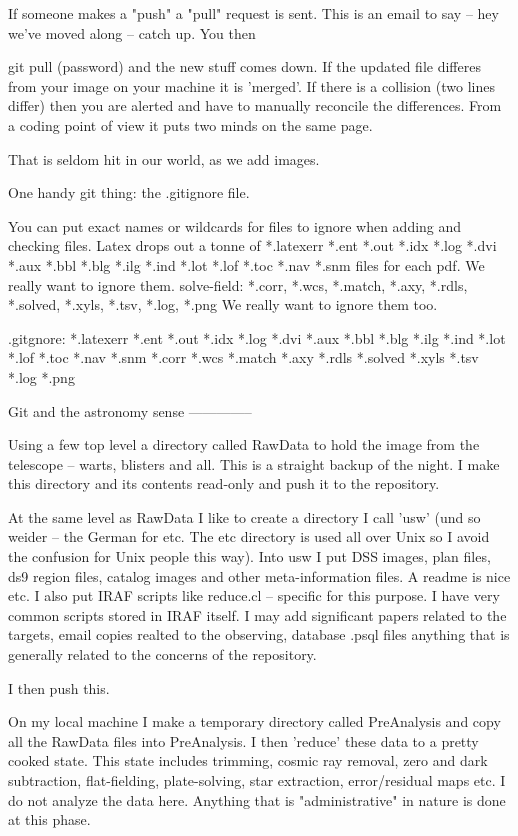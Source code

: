 If someone makes a "push" a "pull" request is sent. This is an email
to say -- hey we've moved along -- catch up. You then

git pull
(password)
and the new stuff comes down.
If the updated file differes from your image on your machine it is
'merged'. If there is a collision (two lines differ) then you are
alerted and have to manually reconcile the differences. From a coding
point of view it puts two minds on the same page.

That is seldom hit in our world, as we add images.

One handy git thing: the .gitignore file.

You can put exact names or wildcards for files to ignore when adding
and checking files. Latex drops out a tonne of *.latexerr *.ent *.out
*.idx *.log *.dvi *.aux *.bbl *.blg *.ilg *.ind *.lot *.lof *.toc
*.nav *.snm files for each pdf. We really want to ignore them.
solve-field: *.corr, *.wcs, *.match, *.axy, *.rdls, *.solved, *.xyls,
*.tsv, *.log, *.png We really want to ignore them too.

.gitgnore:
*.latexerr
*.ent
*.out
*.idx
*.log
*.dvi
*.aux
*.bbl
*.blg
*.ilg
*.ind
*.lot
*.lof
*.toc
*.nav
*.snm
*.corr
*.wcs
*.match
*.axy
*.rdls
*.solved
*.xyls
*.tsv
*.log
*.png


Git and the astronomy sense
--------------

Using a few top level a directory called RawData to hold the image
from the telescope -- warts, blisters and all. This is a straight
backup of the night. I make this directory and its contents read-only
and push it to the repository.

At the same level as RawData I like to create a directory I call
'usw' (und so weider -- the German for etc. The etc directory is used all
over Unix so I avoid the confusion for Unix people this way). Into
usw I put DSS images, plan files, ds9 region files, catalog images
and other meta-information files. A readme is nice etc. I also put
IRAF scripts like reduce.cl -- specific for this purpose. I have
very common scripts stored in IRAF itself. I may add significant 
papers related to the targets, email copies realted to the observing,
database .psql files anything that is generally related to the 
concerns of the repository.

I then push this.

On my local machine I make a temporary directory called PreAnalysis
and copy all the RawData files into PreAnalysis. I then 'reduce' these
data to a pretty cooked state. This state includes trimming, cosmic
ray removal, zero and dark subtraction, flat-fielding, plate-solving,
star extraction, error/residual maps etc. I do not analyze the data
here. Anything that is "administrative" in nature is done at this
phase.

